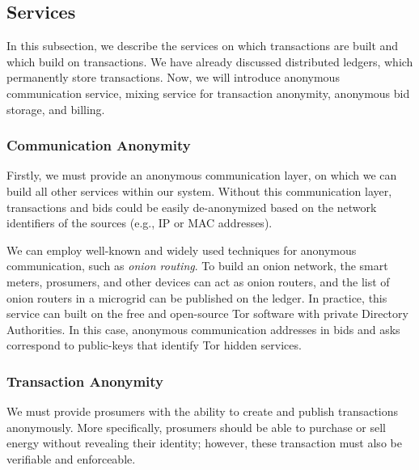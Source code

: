 \subsection{Services}

In this subsection, we describe the services on which transactions are built and which build on transactions.
We have already discussed distributed ledgers, which permanently store transactions.
Now, we will introduce anonymous communication service, mixing service for transaction anonymity, anonymous bid storage, and billing.

\subsubsection{Communication Anonymity}
Firstly, we must provide an anonymous communication layer, on which we can build all other services within our system.
Without this communication layer, transactions and bids could be easily de-anonymized based on the network identifiers of the sources (e.g., IP or MAC addresses).

We can employ well-known and widely used techniques for anonymous communication, such as \emph{onion routing}.
To build an onion network, the smart meters, prosumers, and other devices can act as onion routers, and the list of onion routers in a microgrid can be published on the ledger.
In practice, this service can built on 
 the free and open-source Tor software with private Directory Authorities.
In this case, anonymous communication addresses in bids and asks correspond to public-keys that identify Tor hidden services.

\subsubsection{Transaction Anonymity}
We must provide prosumers with the ability to create and publish transactions anonymously.
More specifically, prosumers should be able to purchase or sell energy without revealing their identity; however, these transaction must also be verifiable and enforceable.

